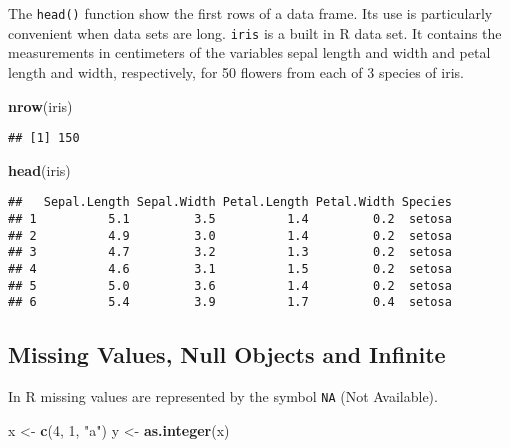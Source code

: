 \documentclass[]{book}
\newenvironment{Shaded}{\begin{snugshade}}{\end{snugshade}}
\newcommand{\KeywordTok}[1]{\textcolor[rgb]{0.13,0.29,0.53}{\textbf{{#1}}}}
\newcommand{\DecValTok}[1]{\textcolor[rgb]{0.00,0.00,0.81}{{#1}}}
\newcommand{\StringTok}[1]{\textcolor[rgb]{0.31,0.60,0.02}{{#1}}}
\newcommand{\NormalTok}[1]{{#1}}
\begin{document}
The \texttt{head()} function show the first rows of a data frame. Its
use is particularly convenient when data sets are long. \texttt{iris} is
a built in R data set. It contains the measurements in centimeters of
the variables sepal length and width and petal length and width,
respectively, for 50 flowers from each of 3 species of iris.

\begin{Shaded}
\begin{Highlighting}[]
\KeywordTok{nrow}\NormalTok{(iris)}
\end{Highlighting}
\end{Shaded}

\begin{verbatim}
## [1] 150
\end{verbatim}

\begin{Shaded}
\begin{Highlighting}[]
\KeywordTok{head}\NormalTok{(iris)}
\end{Highlighting}
\end{Shaded}

\begin{verbatim}
##   Sepal.Length Sepal.Width Petal.Length Petal.Width Species
## 1          5.1         3.5          1.4         0.2  setosa
## 2          4.9         3.0          1.4         0.2  setosa
## 3          4.7         3.2          1.3         0.2  setosa
## 4          4.6         3.1          1.5         0.2  setosa
## 5          5.0         3.6          1.4         0.2  setosa
## 6          5.4         3.9          1.7         0.4  setosa
\end{verbatim}

\subsection{Missing Values, Null Objects and
Infinite}\label{missing-values-null-objects-and-infinite}

In R missing values are represented by the symbol \texttt{NA} (Not
Available).

\begin{Shaded}
\begin{Highlighting}[]
\NormalTok{x <-}\StringTok{ }\KeywordTok{c}\NormalTok{(}\DecValTok{4}\NormalTok{, }\DecValTok{1}\NormalTok{, }\StringTok{"a"}\NormalTok{)}
\NormalTok{y <-}\StringTok{ }\KeywordTok{as.integer}\NormalTok{(x)}
\end{Highlighting}
\end{Shaded}
\end{document}
